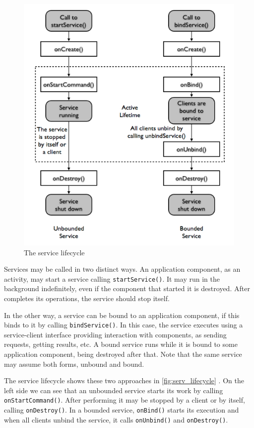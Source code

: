 \begin{figure}[h]
 \begin{center}
 \includegraphics[scale=0.5]{figures/service_lifecycle.png}
 \end{center}
 \caption{The service lifecycle}
 \label{fig:serv_lifecycle}
\end{figure}

Services may be called in two distinct ways. An application component, as an activity, may start a service calling \texttt{startService()}. It may run in the background  indefinitely, even if the component that started it is destroyed. After completes its operations, the service should stop itself.

In the other way, a service can be bound to an application component, if this binds to it by calling \texttt{bindService()}. In this case, the service executes using a service-client interface providing interaction with components, as sending requests, getting results, etc. A bound service runs while it is bound to some application component, being destroyed after that. Note that the same service may assume both forms, unbound and bound.

The service lifecycle shows these two approaches in \autoref{fig:serv_lifecycle}  \cite{Service:Android}. On the left side we can see that an unbounded service starts its work by calling \texttt{onStartCommand()}. After performing it may be stopped by a client or by itself, calling \texttt{onDestroy()}. In a bounded service, \texttt{onBind()} starts its execution and when all clients unbind the service, it calls \texttt{onUnbind()} and \texttt{onDestroy()}.

